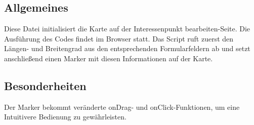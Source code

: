 \subsection{Allgemeines} Diese Datei initialisiert die Karte auf der {\glqq Interessenpunkt bearbeiten\grqq}-Seite.
Die Ausführung des Codes findet im Browser statt. Das Script ruft zuerst den Längen- und Breitengrad aus den entsprechenden Formularfeldern ab und setzt anschließend einen Marker mit diesen Informationen auf der Karte.
\subsection{Besonderheiten}
Der Marker bekommt veränderte onDrag- und onClick-Funktionen, um eine Intuitivere Bedienung zu gewährleisten.